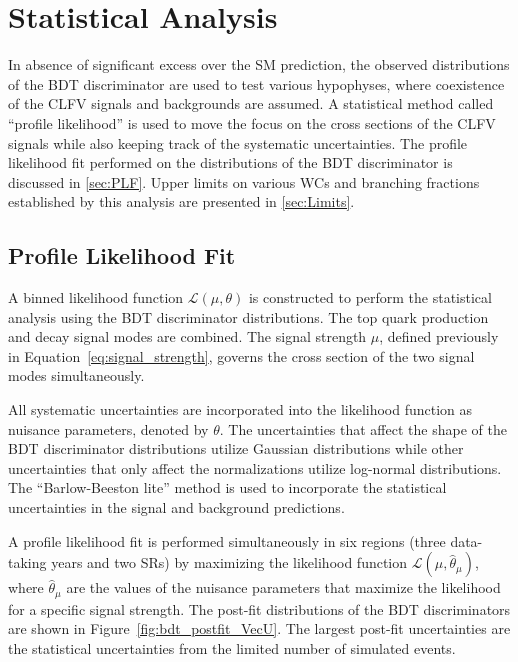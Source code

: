 \chapter{Statistical Analysis}
\label{chap:Results}

In absence of significant excess over the \ac{SM} prediction, the observed distributions of the \ac{BDT} discriminator are used to test various hypophyses, where coexistence of the \ac{CLFV} signals and backgrounds are assumed. A statistical method called ``profile likelihood'' is used to move the focus on the cross sections of the \ac{CLFV} signals while also keeping track of the systematic uncertainties. The profile likelihood fit performed on the distributions of the \ac{BDT} discriminator is discussed in \autoref{sec:PLF}. Upper limits on various \acp{WC} and branching fractions established by this analysis are presented in \autoref{sec:Limits}. 

\section{Profile Likelihood Fit}
\label{sec:PLF}

A binned likelihood function $\mathcal{L}(\mu, \theta)$ is constructed to perform the statistical analysis using the BDT discriminator distributions. The top quark production and decay signal modes are combined. The signal strength $\mu$, defined previously in Equation~\ref{eq:signal_strength}, governs the cross section of the two signal modes simultaneously. 

All systematic uncertainties are incorporated into the likelihood function as nuisance parameters, denoted by $\theta$. The uncertainties that affect the shape of the BDT discriminator distributions utilize Gaussian distributions while other uncertainties that only affect the normalizations utilize log-normal distributions. The ``Barlow-Beeston lite'' method \cite{Barlow:1993dm} is used to incorporate the statistical uncertainties in the signal and background predictions. 

A profile likelihood fit is performed simultaneously in six regions (three data-taking years and two \acp{SR}) by maximizing the likelihood function $\mathcal{L}(\mu, \hat{\theta}_{\mu})$, where $\hat{\theta}_{\mu}$ are the values of the nuisance parameters that maximize the likelihood for a specific signal strength. The post-fit distributions of the BDT discriminators are shown in Figure~\ref{fig:bdt_postfit_VecU}. The largest post-fit uncertainties are the statistical uncertainties from the limited number of simulated events.

